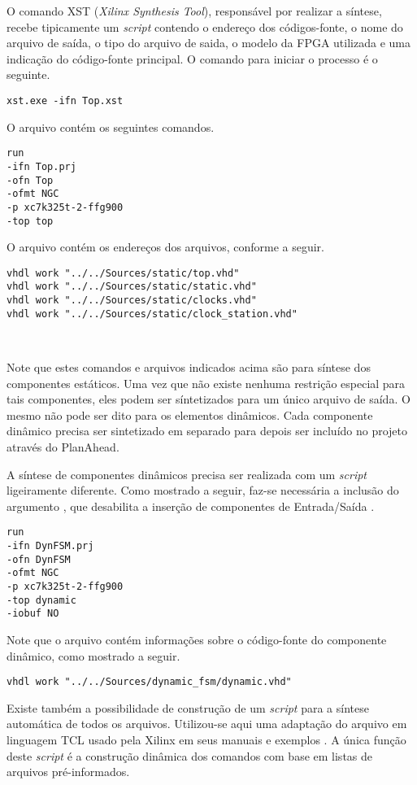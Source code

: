 \documentclass[11pt,a4paper,oneside]{book}
\begin{document}
O comando XST (\textit{Xilinx Synthesis Tool}), responsável por realizar a síntese, recebe tipicamente um \textit{script} contendo o endereço dos códigos-fonte, o nome do arquivo de saída, o tipo do arquivo de saida, o modelo da FPGA utilizada e uma indicação do código-fonte principal.
O comando para iniciar o processo é o seguinte.
\begin{lstlisting}[style=customVHDL]
xst.exe -ifn Top.xst
\end{lstlisting}
O arquivo  contém os seguintes comandos.
\begin{lstlisting}[style=customVHDL]
run
-ifn Top.prj
-ofn Top
-ofmt NGC
-p xc7k325t-2-ffg900
-top top
\end{lstlisting}
O arquivo  contém os endereços dos arquivos, conforme a seguir.
\begin{lstlisting}[style=customVHDL]
vhdl work "../../Sources/static/top.vhd"
vhdl work "../../Sources/static/static.vhd"
vhdl work "../../Sources/static/clocks.vhd"
vhdl work "../../Sources/static/clock_station.vhd"
\end{lstlisting}\

Note que estes comandos e arquivos indicados acima são para síntese dos componentes estáticos.
Uma vez que não existe nenhuma restrição especial para tais componentes, eles podem ser síntetizados para um único arquivo de saída.
O mesmo não pode ser dito para os elementos dinâmicos.
Cada componente dinâmico precisa ser sintetizado em separado para depois ser incluído no projeto através do PlanAhead.

A síntese de componentes dinâmicos precisa ser realizada com um \textit{script}  ligeiramente diferente.
Como mostrado a seguir, faz-se necessária a inclusão do argumento , que desabilita a inserção de componentes de Entrada/Saída \cite{ug743, ug748}.
\begin{lstlisting}[style=customVHDL]
run
-ifn DynFSM.prj
-ofn DynFSM
-ofmt NGC
-p xc7k325t-2-ffg900
-top dynamic
-iobuf NO
\end{lstlisting}
Note que o arquivo  contém informações sobre o código-fonte do componente dinâmico, como mostrado a seguir.
\begin{lstlisting}[style=customVHDL]
vhdl work "../../Sources/dynamic_fsm/dynamic.vhd"
\end{lstlisting}

Existe também a possibilidade de construção de um \textit{script} para a síntese automática de todos os arquivos.
Utilizou-se aqui uma adaptação do arquivo em linguagem TCL usado pela Xilinx em seus manuais e exemplos \cite{ug702, ug743, ug744}.
A única função deste \textit{script} é a construção dinâmica dos comandos com base em listas de arquivos pré-informados.
\end{document}
